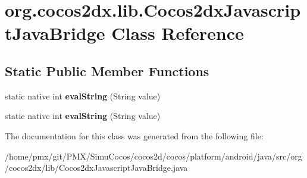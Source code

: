 \hypertarget{classorg_1_1cocos2dx_1_1lib_1_1Cocos2dxJavascriptJavaBridge}{}\section{org.\+cocos2dx.\+lib.\+Cocos2dx\+Javascript\+Java\+Bridge Class Reference}
\label{classorg_1_1cocos2dx_1_1lib_1_1Cocos2dxJavascriptJavaBridge}
\subsection*{Static Public Member Functions}
\begin{DoxyCompactItemize}
\item 
\mbox{\label{classorg_1_1cocos2dx_1_1lib_1_1Cocos2dxJavascriptJavaBridge_a990a82f07bcaff00f8903aa6262ce184}} 
static native int {\bfseries eval\+String} (String value)
\item 
\mbox{\label{classorg_1_1cocos2dx_1_1lib_1_1Cocos2dxJavascriptJavaBridge_a990a82f07bcaff00f8903aa6262ce184}} 
static native int {\bfseries eval\+String} (String value)
\end{DoxyCompactItemize}


The documentation for this class was generated from the following file\+:\begin{DoxyCompactItemize}
\item 
/home/pmx/git/\+P\+M\+X/\+Simu\+Cocos/cocos2d/cocos/platform/android/java/src/org/cocos2dx/lib/Cocos2dx\+Javascript\+Java\+Bridge.\+java\end{DoxyCompactItemize}
